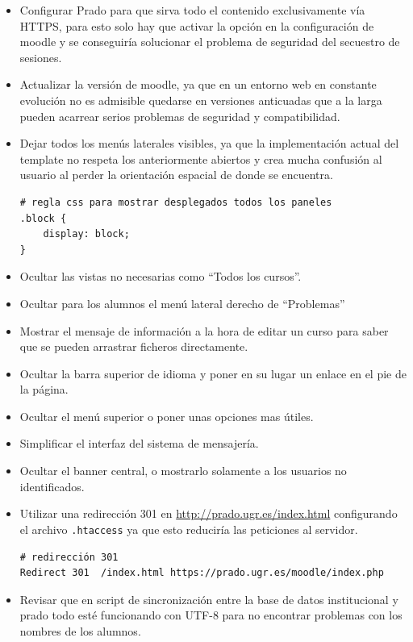 \begin{itemize}
	\item Configurar Prado para que sirva todo el contenido exclusivamente vía HTTPS, para esto solo hay que activar la opción en la configuración de moodle y se conseguiría solucionar el problema de seguridad del secuestro de sesiones.

	\item Actualizar la versión de moodle, ya que en un entorno web en constante evolución no es admisible quedarse en versiones anticuadas que a la larga pueden acarrear serios problemas de seguridad y compatibilidad.

	\item Dejar todos los menús laterales visibles, ya que la implementación actual del template no respeta los anteriormente abiertos y crea mucha confusión al usuario al perder la orientación espacial de donde se encuentra.
\begin{lstlisting}
# regla css para mostrar desplegados todos los paneles
.block {
	display: block;
}
\end{lstlisting}

	\item Ocultar las vistas no necesarias como ``Todos los cursos''.
	\item Ocultar para los alumnos el menú lateral derecho de ``Problemas''
	\item Mostrar el mensaje de información a la hora de editar un curso para saber que se pueden arrastrar ficheros directamente.
	\item Ocultar la barra superior de idioma y poner en su lugar un enlace en el pie de la página.
	\item Ocultar el menú superior o poner unas opciones mas útiles.
	\item Simplificar el interfaz del sistema de mensajería.
	\item Ocultar el banner central, o mostrarlo solamente a los usuarios no identificados.
	\item Utilizar una redirección 301 en \url{http://prado.ugr.es/index.html} configurando el archivo \texttt{.htaccess} ya que esto reduciría las peticiones al servidor.
\begin{lstlisting}
# redirección 301
Redirect 301  /index.html https://prado.ugr.es/moodle/index.php
\end{lstlisting}
	
	\item Revisar que en script de sincronización entre la base de datos institucional y prado todo esté funcionando con UTF-8 para no encontrar problemas con los nombres de los alumnos.



\end{itemize}
